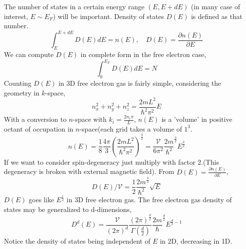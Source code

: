 \documentclass{article}
\begin{document}
The number of states in a certain energy range $(E,E+dE)$ (in many case of interest, $E\sim E_F$) will be important. Density of states $D(E)$ is defined as that number.
$$\int_E^{E+dE}D(E)dE=n(E), \quad D(E)=\frac{\partial n(E)}{\partial E}$$
We can compute $D(E)$ in complete form in the free electron case,
$$\int_0^{E_F} D(E)dE=N$$
Counting $D(E)$ in 3D free electron gas is fairly simple, considering the geometry in $k$-space,
$$n_x^2+n_y^2+n_z^2=\frac{2mL^2}{\hbar^2\pi^2} E$$
With a conversion to $n$-space with $k_i=\frac{2n_i\pi}{L}$, $n(E)$ is a 'volume' in positive octant of occupation in $n$-space(each grid takes a volume of $1^3$.
$$n(E)=\frac{1}{8}\frac{4\pi}{3}(\frac{2mL^2}{\hbar^2\pi^2})^\frac{3}{2}=\frac{\mathcal{V}}{6\pi^2}\frac{2m}{\hbar^2}^\frac{3}{2}E^\frac{3}{2}$$
If we want to consider spin-degeneracy just multiply with factor 2.(This degeneracy is broken with external magnetic field). From $D(E)=\frac{\partial n(E)}{\partial E}$,
$$D(E)/\mathcal{V}=\frac{1}{2}\frac{2m}{\hbar^2}^{\frac{3}{2}}\sqrt{E}$$
$D(E)$ goes like $E^{\frac{1}{2}}$ in 3D free electron gas. The free electron gas density of states may be generalized to d-dimensions,
$$D^d(E)=\frac{\mathcal{V}}{(2\pi)^d}\frac{(2\pi)^\frac{d}{2}}{\Gamma(\frac{d}{2})}\frac{2m}{\hbar}^{\frac{d}{2}}E^{\frac{d}{2}-1}$$
Notice the density of states being independent of $E$ in 2D, decreasing in 1D.
\end{document}
